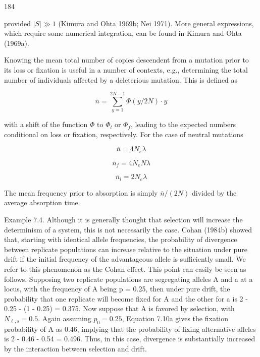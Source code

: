 \documentclass{article}
\begin{document}
184

provided  $ |S| \gg 1 $ (Kimura and Ohta 1969b; Nei 1971). More general expressions, which require some numerical integration, can be found in Kimura and Ohta (1969a).

Knowing the mean total number of copies descendent from a mutation prior to its loss or fixation is useful in a number of contexts, e.g., determining the total number of individuals affected by a deleterious mutation. This is defined as

\begin{equation}
\overline{n}=\sum_{y=1}^{2N-1}\Phi(y/2N)\cdot y
\tag{7.17a}
\label{eq:7_17a}
\end{equation}

with a shift of the function  $ \Phi $ to  $ \Phi_{l} $ or  $ \Phi_{f} $, leading to the expected numbers conditional on loss or fixation, respectively. For the case of neutral mutations

\begin{equation}
\overline{n}=4N_{e}\lambda
\tag{7.17b}
\label{eq:7_17b}
\end{equation}

\begin{equation}
\overline{n}_{f}=4N_{e}N\lambda
\tag{7.17c}
\label{eq:7_17c}
\end{equation}

\begin{equation}
\overline{n}_{l}=2N_{e}\lambda
\tag{7.17d}
\label{eq:7_17d}
\end{equation}

The mean frequency prior to absorption is simply  $ \overline{n}/(2N) $ divided by the average absorption time.

Example 7.4. Although it is generally thought that selection will increase the determinism of a system, this is not necessarily the case. Cohan (1984b) showed that, starting with identical allele frequencies, the probability of divergence between replicate populations can increase relative to the situation under pure drift if the initial frequency of the advantageous allele is sufficiently small. We refer to this phenomenon as the Cohan effect. This point can easily be seen as follows. Supposing two replicate populations are segregating alleles A and a at a locus, with the frequency of A being p = 0.25, then under pure drift, the probability that one replicate will become fixed for A and the other for a is 2 - 0.25 - (1 - 0.25) = 0.375. Now suppose that A is favored by selection, with  $ N_{\ell,s} = 0.5 $. Again assuming  $ p_0 = 0.25 $, Equation 7.10a gives the fixation probability of A as 0.46, implying that the probability of fixing alternative alleles is 2 - 0.46 - 0.54 = 0.496. Thus, in this case, divergence is substantially increased by the interaction between selection and drift.
\end{document}
